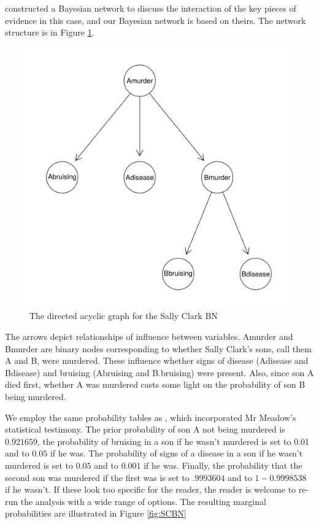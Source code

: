 \documentclass[10pt,]{scrartcl}
\begin{document}
\citet{Fenton2018Risk} constructed a Bayesian network to discuss the interaction of the key pieces of evidence in this case, and our Bayesian network is based on theirs.  The network structure is in Figure \ref{fig:sc}.


\begin{figure}[H]
    \centering
    \includegraphics[width = 12cm]{SC.png}
    \caption{The directed acyclic graph for the Sally Clark BN}
    \label{fig:sc}
\end{figure}



The  arrows  depict  relationships  of  influence  between  variables. \textsf{Amurder} and \textsf{Bmurder} are binary nodes corresponding to whether Sally  Clark’s  sons,   call  them A and B, were murdered. These  influence  whether  signs of disease (\textsf{Adisease} and \textsf{Bdisease}) and bruising (\textsf{Abruising} and \textsf{B.bruising}) were present. Also, since  son A died first, whether A was murdered casts some light on the probability of son B being murdered.

We employ the same probability tables as \citet{Fenton2018Risk}, which incorporated Mr Meadow's statistical testimony. The prior probability of son A not being murdered is $0.921659$, the probability of bruising in a son if he wasn't murdered is set to 0.01 and to $0.05$ if he was. The probability of signs of a disease in a son if he wasn't murdered is set to $0.05$ and to $0.001$ if he was. Finally, the probability that the second son was murdered if the first was is set to $.9993604$ and to $1-0.9998538$ if he wasn't. If these look too specific for the reader, the reader is welcome to re-run the analysis with a wide range of options. The resulting marginal probabilities are illustrated in Figure \ref{fig:SCBN}
\end{document}
